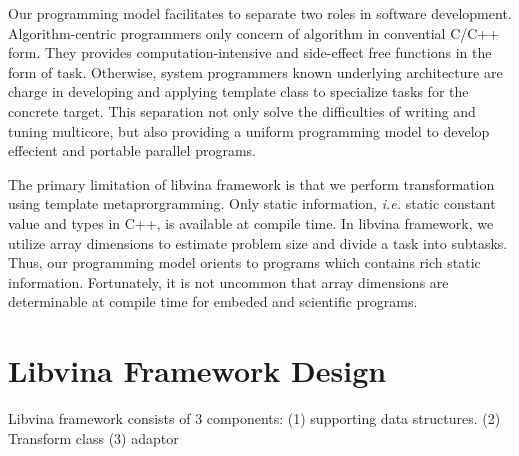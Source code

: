 Our programming model facilitates to separate two roles in software
development. Algorithm-centric programmers only concern of algorithm
in convential C/C++ form. They provides computation-intensive and
side-effect free functions in the form of task. Otherwise, system
programmers known underlying architecture are charge in developing and
applying template class to specialize tasks for the concrete
target. This separation not only solve the difficulties of writing and
tuning multicore, but also providing a uniform programming model to
develop effecient and portable parallel programs.

The primary limitation of libvina framework is that we perform
transformation using template metaprorgramming.  Only static
information, \textit{i.e.} static constant value and types in C++, is
available at compile time. In libvina framework, we utilize array
dimensions to estimate problem size and divide a task into
subtasks. Thus, our programming model orients to programs which
contains rich static information.  Fortunately, it is not uncommon
that array dimensions are determinable at compile time for embeded and
scientific programs.

\section{Libvina Framework Design}
Libvina framework consists of 3 components: (1) supporting data
structures. (2) Transform class (3) adaptor 
